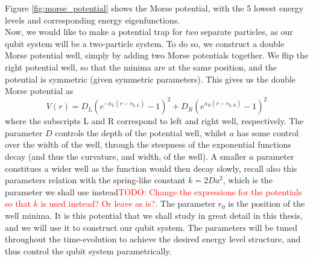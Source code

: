 \documentclass{subfiles}
\begin{document}
Figure \ref{fig:morse_potential} shows the Morse potential, with the 5 lowest energy levels and corresponding energy eigenfunctions. \\


Now, we would like to make a potential trap for \emph{two} separate particles, as our qubit system will be a two-particle system. To do so, we construct a double Morse potential well, simply by adding two Morse potentials together. We flip the right potential well, so that the minima are at the same position, and the potential is symmetric (given symmetric parameters). This gives us the double Morse potential as
\begin{equation}
    V(r) = D_L(e^{-a_L(r-r_{0,L})} - 1)^2 + D_R(e^{a_R(r-r_{0,R})} - 1)^2\label{eq:double_well_morse_potential}
\end{equation}
where the subscripts L and R correspond to left and right well, respectively. The parameter $D$ controls the depth of the potential well, whilst $a$ has some control over the width of the well, through the steepness of the exponential functions decay (and thus the curvature, and width, of the well). A smaller $a$ parameter constitues a wider well as the function would then decay slowly, recall also this parameters relation with the spring-like constant $k=2Da^2$, which is the parameter we shall use instead\textcolor{red}{TODO: Change the expressions for the potentials so that $k$ is used instead? Or leave as is?}. The parameter $r_0$ is the position of the well minima. It is this potential that we shall study in great detail in this thesis, and we will use it to construct our qubit system. The parameters will be tuned throughout the time-evolution to achieve the desired energy level structure, and thus control the qubit system parametrically.
\end{document}
